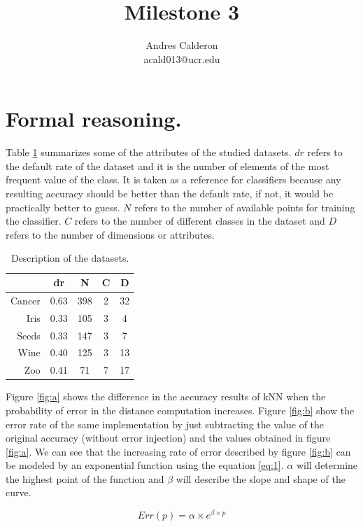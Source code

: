 \documentclass{article}
\title{Milestone 3}
\author{Andres Calderon \\ acald013@ucr.edu}
\begin{document}
\maketitle

\section{Formal reasoning.}\label{sec:formal}
Table \ref{tab:desc} summarizes some of the attributes of the studied datasets. $dr$ refers to the default rate of the dataset and it is the number of elements of the most frequent value of the class.  It is taken as a reference for classifiers because any resulting accuracy should be better than the default rate, if not, it would be practically better to guess. $N$ refers to the number of available points for training the classifier. $C$ refers to the number of different classes in the dataset and $D$ refers to the number of dimensions or attributes. 

\begin{table}[h]
 \centering
 \begin{tabular}{rcccc}
  \toprule
	& \textbf{dr}	& \textbf{N}	& \textbf{C}	& \textbf{D} 	\\
  \midrule
Cancer	& 0.63	& 398	& 2	& 32 	\\
Iris	& 0.33	& 105	& 3	& 4 	\\
Seeds	& 0.33	& 147	& 3	& 7 	\\
Wine	& 0.40	& 125	& 3	& 13 	\\
Zoo	& 0.41	& 71	& 7	& 17 	\\
  \bottomrule
 \end{tabular}
 \caption{Description of the datasets.}\label{tab:desc}
\end{table}

Figure \ref{fig:a} shows the difference in the accuracy results of kNN when the probability of error in the distance computation increases. Figure \ref{fig:b} show the error rate of the same implementation by just subtracting the value of the original accuracy (without error injection) and the values obtained in figure \ref{fig:a}.  We can see that the increasing rate of error described by figure \ref{fig:b} can be modeled by an exponential function using the equation \ref{eq:1}. $\alpha$ will determine the highest point of the function and  $\beta$ will describe the slope and shape of the curve.

\begin{equation}\label{eq:1}
  Err(p) = \alpha \times e^{\beta \times p}
\end{equation}
\end{document}
